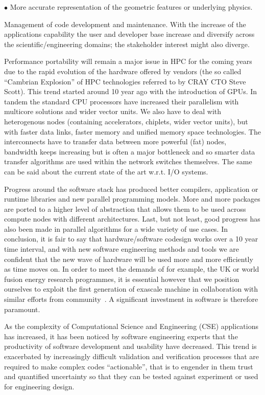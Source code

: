 \documentclass{article}
\begin{document}
\item[$\bullet$] More accurate representation of the geometric features or underlying physics.

\item Management of code development and maintenance. With the increase of the applications 
capability the user and developer base increase and diversify across the scientific/engineering 
domains; the stakeholder interest might also diverge.

Performance portability will remain a major issue in HPC for the coming years due 
to the rapid evolution of the hardware offered by vendors (the so called ``Cambrian 
Explosion'' of HPC technologies referred to by CRAY CTO Steve Scott). This trend 
started around 10 year ago with the introduction of GPUs. In tandem the standard 
CPU processors have increased their parallelism with multicore solutions and wider 
vector units.  We also have to deal with heterogenous nodes (containing accelerators, 
chiplets, wider vector units), but with faster data links, faster memory and unified 
memory space technologies. The interconnects have to transfer data between more 
powerful (fat) nodes, bandwidth keeps increasing but is often a major bottleneck 
and so smarter data transfer algorithms are used within the network switches themselves. 
The same can be said about the current state of the art w.r.t. I/O systems. 

Progress around the software stack has produced better compilers, application or 
runtime libraries and new parallel programming models. More and more packages are 
ported to a higher level of abstraction that allows them to be used across compute 
nodes with different architectures. Last, but not least, good progress has also 
been made in parallel algorithms for a wide variety of use cases. In conclusion, 
it is fair to say that hardware/software codesign works over a 10 year time interval, 
and with new software engineering methods and tools we are confident that the new 
wave of hardware will be used more and more efficiently as time moves on. In order 
to meet the demands of for example, the UK or world fusion energy research programmes, 
it is essential however that we position ourselves to exploit the first generation 
of exascale machine in collaboration with similar efforts from community~\cite{ref [3]}. A 
significant investment in software is therefore paramount.

As the complexity of Computational Science and Engineering (CSE) applications has 
increased, it has been noticed by software engineering experts that the productivity 
of software development and usability have decreased. This trend is exacerbated 
by increasingly difficult validation and verification processes that are required 
to make complex codes ``actionable'', that is to engender in them trust and quantified 
uncertainty so that they can be tested against experiment or used for engineering 
design.
\end{document}
